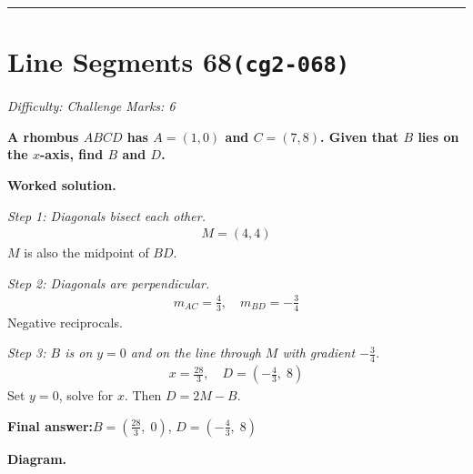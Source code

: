 \documentclass[11pt]{article}
\newcommand{\question}[1]{\par\medskip\noindent\textbf{#1}\par}
\begin{document}
\medskip\hrule

\section*{Line Segments 68\quad\small\texttt{(cg2-068)}}
\textit{Difficulty: Challenge \quad\textbar\quad Marks: 6}

\question{A rhombus \( ABCD \) has \( A = (1, 0) \) and \( C = (7, 8) \). Given that \( B \) lies on the \( x \)-axis, find \( B \) and \( D \).}

\textbf{Worked solution.}

\textit{Step 1: Diagonals bisect each other.}
\[\begin{gathered}
M = (4, 4)
\end{gathered}\]
\(M\) is also the midpoint of \(BD\).

\textit{Step 2: Diagonals are perpendicular.}
\[\begin{gathered}
m_{AC} = \frac{4}{3}, \quad m_{BD} = -\frac{3}{4}
\end{gathered}\]
Negative reciprocals.

\textit{Step 3: \(B\) is on \(y = 0\) and on the line through \(M\) with gradient \(-\frac{3}{4}\).}
\[\begin{gathered}
x = \frac{28}{3}, \quad D = \left(-\frac{4}{3},\; 8\right)
\end{gathered}\]
Set \(y = 0\), solve for \(x\). Then \(D = 2M - B\).

\begin{answerbox}
\textbf{Final answer:}\quad \(\displaystyle B = \left(\frac{28}{3},\; 0\right)\), \(\displaystyle D = \left(-\frac{4}{3},\; 8\right)\)
\end{answerbox}
\textbf{Diagram.}
\end{document}

